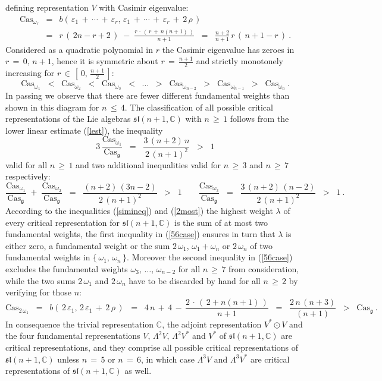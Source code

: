 \documentclass[12pt]{article}
\def\C{\mathbb{C}}
\def\Cas{\mathrm{Cas}}
\def\e{\varepsilon}
\def\g{\mathfrak{g}}
\def\L{\Lambda}
\def\sl{\mathfrak{sl}}
\begin{document}
 defining representation $V$ with Casimir eigenvalue:
 \begin{eqnarray*}
  \Cas_{\omega_r}
  &=&
  b(\,\e_1\,+\,\cdots\,+\,\e_r,\,\e_1\,+\,\cdots\,+\,\e_r\,+\,2\,\rho\,)
  \\
  &=&
  r\,(\,2n-r+2\,)\;-\;\frac{r\,\cdot\,(\,r\,+\,n(n+1)\,)}{n+1}
  \;\;=\;\;
  \frac{n+2}{n+1}\,r\,(\,n+1-r\,)\ .
 \end{eqnarray*}
 Considered as a quadratic polynomial in $r$ the Casimir eigenvalue has zeroes
 in $r\,=\,0,\,n+1$, hence it is symmetric about $r\,=\,\frac{n+1}2$ and
 strictly monotonely increasing for $r\,\in\,[\,0,\,\frac{n+1}2\,]$:
 \begin{equation}\label{simineq}
  \Cas_{\omega_1}
  \;\;<\;\;
  \Cas_{\omega_2}
  \;\;<\;\;
  \Cas_{\omega_3}
  \;\;<\;\;
  \ldots
  \;\;>\;\;
  \Cas_{\omega_{n-2}}
  \;\;>\;\;
  \Cas_{\omega_{n-1}}
  \;\;>\;\;
  \Cas_{\omega_n}\ .
 \end{equation}
 In passing we observe that there are fewer different fundamental weights than
 shown in this diagram for $n\,\leq\,4$. The classification of all possible
 critical representations of the Lie algebras $\sl(n+1,\C)$ with $n\,\geq\,1$
 follows from the lower linear estimate (\ref{lest}), the inequality
 \begin{equation}\label{2most}
  3\,\frac{\Cas_{\omega_1}}{\Cas_\g}
  \;\;=\;\;
  \frac{3\,(n+2)\,n}{2\,(n+1)^2}
  \;\;>\;\;
  1
 \end{equation}
 valid for all $n\,\geq\,1$ and two additional inequalities valid
 for $n\,\geq\,3$ and $n\,\geq\,7$ respectively:
 \begin{equation}\label{56case}
  \frac{\Cas_{\omega_1}}{\Cas_\g}\;+\;\frac{\Cas_{\omega_2}}{\Cas_\g}
  \;\;=\;\;
  \frac{(n+2)\,(3n-2)}{2\,(n+1)^2}
  \;\;>\;\;
  1
  \qquad
  \frac{\Cas_{\omega_3}}{\Cas_\g}
  \;\;=\;\;
  \frac{3\,(n+2)\,(n-2)}{2\,(n+1)^2}
  \;\;>\;\;
  1\ .
 \end{equation}
 According to the inequalities (\ref{simineq}) and (\ref{2most}) the highest
 weight $\lambda$ of every critical representation for $\sl(n+1,\C)$ is the
 sum of at most two fundamental weights, the first inequality in (\ref{56case})
 ensures in turn that $\lambda$ is either zero, a fundamental weight or the
 sum $2\,\omega_1$, $\omega_1+\omega_n$ or $2\,\omega_n$ of two fundamental
 weights in $\{\,\omega_1,\,\omega_n\,\}$. Moreover the second inequality in
 (\ref{56case}) excludes the fundamental weights $\omega_3,\,\ldots,\,
 \omega_{n-2}$ for all $n\,\geq\,7$ from consideration, while the two sums
 $2\,\omega_1$ and $2\,\omega_n$ have to be discarded by hand for all
 $n\,\geq\,2$ by verifying for those $n$:
 $$
  \Cas_{2\,\omega_1}
  \;\;=\;\;
  b(\,2\,\e_1,\,2\,\e_1\,+\,2\,\rho\,)
  \;\;=\;\;
  4\,n\,+\,4\,-\,\frac{2\,\cdot\,(\,2+n(n+1)\,)}{n+1}
  \;\;=\;\;
  \frac{2\,n\,(n+3)}{(n+1)}
  \;\;>\;\;
  \Cas_\g\ .
 $$
 In consequence the trivial representation $\C$, the adjoint representation
 $V^*\odot V$ and the four fundamental representations $V,\,\L^2V,\,\L^2V^*$
 and $V^*$ of $\sl(n+1,\C)$ are critical representations, and they comprise
 all possible critical representations of $\sl(n+1,\C)$ unless $n\,=\,5$ or
 $n\,=\,6$, in which case $\L^3V$ and $\L^3V^*$ are critical representations
 of $\sl(n+1,\C)$ as well.
\end{document}
